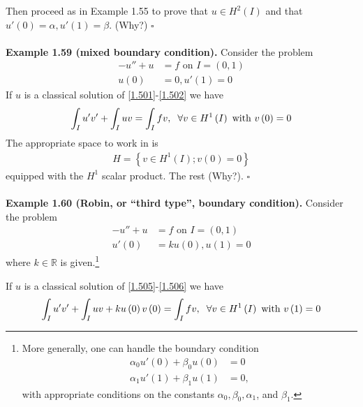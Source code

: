 \documentclass[a4paper,oneside]{book}
\numberwithin{equation}{chapter}
\begin{document}
Then proceed as in Example 1.55 to prove that $u\in H^2\left(I\right)$ and that $u'\left(0\right)=\alpha,u'\left(1\right)=\beta$. (Why?) \hfill $\square$\\
\\
\textbf{Example 1.59 (mixed boundary condition).} Consider the problem
\begin{align}
\label{1.501}
 - u'' + u &= f\mbox{ on } I = \left( {0,1} \right)\\
u\left( 0 \right) &= 0,u'\left( 1 \right) = 0 \label{1.502}
\end{align} 
If $u$ is a classical solution of \eqref{1.501}-\eqref{1.502} we have
\begin{align}
\int_I {u'v'}  + \int_I {uv}  = \int_I {fv} ,\hspace{0.2cm}\forall v \in {H^1}\left( I \right)\mbox{ with } v\left( 0 \right) = 0
\end{align}
The appropriate space to work in is
\begin{align}
H = \left\{ {v \in {H^1}\left( I \right);v\left( 0 \right) = 0} \right\}
\end{align}
equipped with the $H^1$ scalar product. The rest (Why?). \hfill $\square$\\
\\
\textbf{Example 1.60 (Robin, or ``third type'', boundary condition).} Consider the problem
\begin{align}
\label{1.505}
 - u'' + u &= f\mbox{ on } I = \left( {0,1} \right)\\
u'\left( 0 \right) &= ku\left( 0 \right),u\left( 1 \right) = 0 \label{1.506}
\end{align}
where $k\in \mathbb{R}$ is given.\footnote{More generally, one can handle the boundary condition
\begin{align}
{\alpha _0}u'\left( 0 \right) + {\beta _0}u\left( 0 \right) &= 0\\
{\alpha _1}u'\left( 1 \right) + {\beta _1}u\left( 1 \right) &= 0,
\end{align}
with appropriate conditions on the constants $\alpha _0,\beta _0,\alpha _1$, and $\beta _1$.}

If $u$ is a classical solution of \eqref{1.505}-\eqref{1.506} we have
\begin{align}
\int_I {u'v'}  + \int_I {uv}  + ku\left( 0 \right)v\left( 0 \right) = \int_I {fv} ,\hspace{0.2cm}\forall v \in {H^1}\left( I \right)\mbox{ with } v\left( 1 \right) = 0
\end{align}
\end{document}
